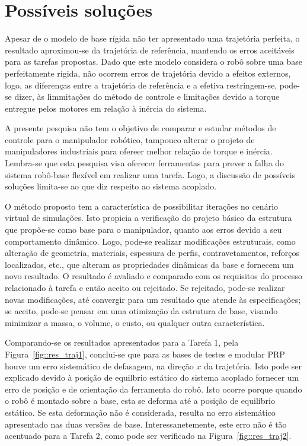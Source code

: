 \section{Possíveis soluções} \label{sec::solucoes}

Apesar de o modelo de base rígida não ter apresentado uma trajetória perfeita, o
resultado aproximou-se da trajetória de referência, mantendo os erros aceitáveis
para as tarefas propostas. Dado que este modelo considera o robô sobre uma base
perfeitamente rígida, não ocorrem erros de trajetória devido a efeitos externos,
logo, as diferenças entre a trajetória de referência e a efetiva restringem-se,
pode-se dizer, às limmitações do método de controle e limitações devido a torque
entregue pelos motores em relação à inércia do sistema.

A presente pesquisa não tem o objetivo de comparar e estudar métodos de controle
para o manipulador robótico, tampouco alterar o projeto de manipuladores
industriais para ofereer melhor relação de torque e inércia. Lembra-se que esta
pesquisa visa oferecer ferramentas para prever a falha do sistema robô-base
flexível em realizar uma tarefa. Logo, a discussão de possíveis soluções
limita-se ao que diz respeito ao sistema acoplado. 

O método proposto tem a característica de possibilitar iterações no cenário
virtual de simulações. Isto propicia a verificação do projeto básico da
estrutura que propõe-se como base para o manipulador, quanto aos erros devido a
seu comportamento dinâmico. Logo, pode-se realizar modificações estruturais,
como alteração de geometria, materiais, espessura de perfis, contravetamentos,
reforços localizados, etc., que alteram as propriedades dinâmicas da base e
fornecem um novo resultado. O resultado é avaliado e comparado com os requisitos
do processo relacionado à tarefa e então aceito ou rejeitado. Se rejeitado,
pode-se realizar novas modificações, até convergir para um resultado que atende
às especificações; se aceito, pode-se pensar em uma otimização da estrutura de
base, visando minimizar a massa, o volume, o custo, ou qualquer outra
característica.

Comparando-se os resultados apresentados para a Tarefa 1, pela
Figura~\ref{fig::res_traj1}, conclui-se que para as bases de testes e modular
PRP houve um erro sistemático de defasagem, na direção $x$ da trajetória. Isto
pode ser explicado devido à posição de equilbrio estático do sistema acoplado
fornecer um erro de posição e de orientação da ferramenta do robô. Isto ocorre
porque quando o robô é montado sobre a base, esta se deforma até a posição de
equilíbrio estático. Se esta deformação não é considerada, resulta no erro
sistemático apresentado nas duas versões de base. Interessanetemente, este erro
não é tão acentuado para a Tarefa 2, como pode ser verificado na
Figura~\ref{fig::res_traj2}.

